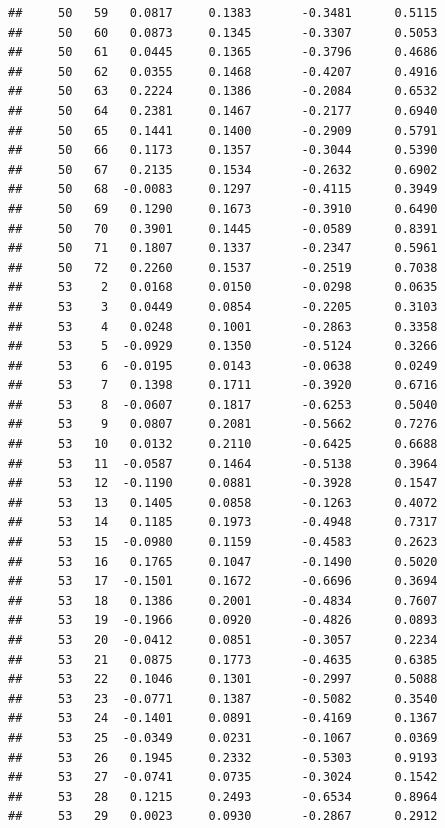 \documentclass[
]{article}
\begin{document}
\begin{verbatim}
##     50   59   0.0817     0.1383       -0.3481      0.5115  
##     50   60   0.0873     0.1345       -0.3307      0.5053  
##     50   61   0.0445     0.1365       -0.3796      0.4686  
##     50   62   0.0355     0.1468       -0.4207      0.4916  
##     50   63   0.2224     0.1386       -0.2084      0.6532  
##     50   64   0.2381     0.1467       -0.2177      0.6940  
##     50   65   0.1441     0.1400       -0.2909      0.5791  
##     50   66   0.1173     0.1357       -0.3044      0.5390  
##     50   67   0.2135     0.1534       -0.2632      0.6902  
##     50   68  -0.0083     0.1297       -0.4115      0.3949  
##     50   69   0.1290     0.1673       -0.3910      0.6490  
##     50   70   0.3901     0.1445       -0.0589      0.8391  
##     50   71   0.1807     0.1337       -0.2347      0.5961  
##     50   72   0.2260     0.1537       -0.2519      0.7038  
##     53    2   0.0168     0.0150       -0.0298      0.0635  
##     53    3   0.0449     0.0854       -0.2205      0.3103  
##     53    4   0.0248     0.1001       -0.2863      0.3358  
##     53    5  -0.0929     0.1350       -0.5124      0.3266  
##     53    6  -0.0195     0.0143       -0.0638      0.0249  
##     53    7   0.1398     0.1711       -0.3920      0.6716  
##     53    8  -0.0607     0.1817       -0.6253      0.5040  
##     53    9   0.0807     0.2081       -0.5662      0.7276  
##     53   10   0.0132     0.2110       -0.6425      0.6688  
##     53   11  -0.0587     0.1464       -0.5138      0.3964  
##     53   12  -0.1190     0.0881       -0.3928      0.1547  
##     53   13   0.1405     0.0858       -0.1263      0.4072  
##     53   14   0.1185     0.1973       -0.4948      0.7317  
##     53   15  -0.0980     0.1159       -0.4583      0.2623  
##     53   16   0.1765     0.1047       -0.1490      0.5020  
##     53   17  -0.1501     0.1672       -0.6696      0.3694  
##     53   18   0.1386     0.2001       -0.4834      0.7607  
##     53   19  -0.1966     0.0920       -0.4826      0.0893  
##     53   20  -0.0412     0.0851       -0.3057      0.2234  
##     53   21   0.0875     0.1773       -0.4635      0.6385  
##     53   22   0.1046     0.1301       -0.2997      0.5088  
##     53   23  -0.0771     0.1387       -0.5082      0.3540  
##     53   24  -0.1401     0.0891       -0.4169      0.1367  
##     53   25  -0.0349     0.0231       -0.1067      0.0369  
##     53   26   0.1945     0.2332       -0.5303      0.9193  
##     53   27  -0.0741     0.0735       -0.3024      0.1542  
##     53   28   0.1215     0.2493       -0.6534      0.8964  
##     53   29   0.0023     0.0930       -0.2867      0.2912  

\end{verbatim}
\end{document}
